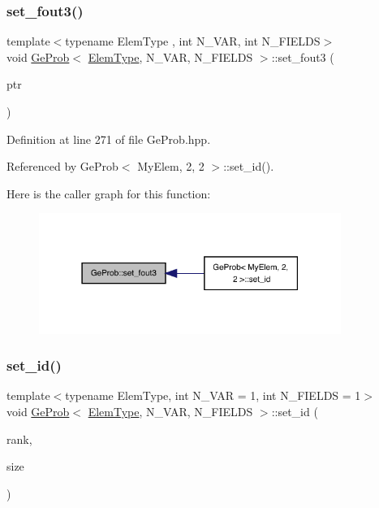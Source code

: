 \subsubsection{\texorpdfstring{set\+\_\+fout3()}{set\_fout3()}}
{\footnotesize\ttfamily template$<$typename Elem\+Type , int N\+\_\+\+V\+AR, int N\+\_\+\+F\+I\+E\+L\+DS$>$ \\
void \hyperlink{classGeProb}{Ge\+Prob}$<$ \hyperlink{spectral_8h_aaa2c1a7b2d1b12c590d730fe6ac839fa}{Elem\+Type}, N\+\_\+\+V\+AR, N\+\_\+\+F\+I\+E\+L\+DS $>$\+::set\+\_\+fout3 (\begin{DoxyParamCaption}\item[{F\+I\+LE $\ast$}]{ptr }\end{DoxyParamCaption})}



Definition at line 271 of file Ge\+Prob.\+hpp.



Referenced by Ge\+Prob$<$ My\+Elem, 2, 2 $>$\+::set\+\_\+id().

Here is the caller graph for this function\+:
\nopagebreak
\begin{figure}[H]
\begin{center}
\leavevmode
\includegraphics[width=279pt]{classGeProb_a2fa255c26250f6ee540b910949f530ed_icgraph}
\end{center}
\end{figure}
\mbox{\label{classGeProb_ae922c4a2ec2974c44cbcfa02e56855db}} 
\subsubsection{\texorpdfstring{set\+\_\+id()}{set\_id()}}
{\footnotesize\ttfamily template$<$typename Elem\+Type, int N\+\_\+\+V\+AR = 1, int N\+\_\+\+F\+I\+E\+L\+DS = 1$>$ \\
void \hyperlink{classGeProb}{Ge\+Prob}$<$ \hyperlink{spectral_8h_aaa2c1a7b2d1b12c590d730fe6ac839fa}{Elem\+Type}, N\+\_\+\+V\+AR, N\+\_\+\+F\+I\+E\+L\+DS $>$\+::set\+\_\+id (\begin{DoxyParamCaption}\item[{const int}]{rank,  }\item[{const int}]{size }\end{DoxyParamCaption})\hspace{0.3cm}{\ttfamily [inline]}}



